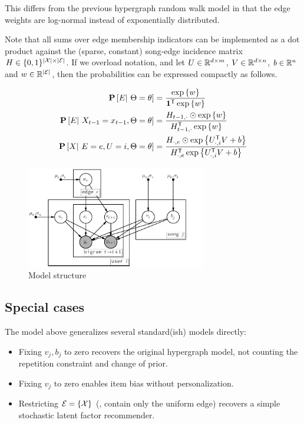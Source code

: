 \documentclass{article}
\def\E{\ensuremath{\mathcal{E}}}
\begin{document}
This differs from the previous hypergraph random walk model in that the edge weights are log-normal instead of exponentially distributed.  

Note that all sums over edge membership indicators can be implemented as a dot product against the (sparse, constant) 
song-edge incidence matrix $H \in \{0,1\}^{|\X| \times |\E|}$.  If we overload notation, and let $U \in \mathbb{R}^{d\times m}$, $V \in \mathbb{R}^{d \times n}$, $b \in \mathbb{R}^{n}$ and $w \in
\R^{|\E|}$, then the probabilities can be expressed compactly as follows.

\begin{align*}
\mathbf{P}\left[E |~ \Theta=\theta\right] &= \frac{\exp\left\{w\right\}}{\mathbf{1}^\mathsf{T} \exp\left\{w\right\}}\\
\mathbf{P}\left[E |~ X_{t-1}=x_{t-1}, \Theta=\theta\right] &= \frac{ H_{t-1, \cdot} \odot \exp\left\{w\right\} }{H_{t-1, \cdot}^\mathsf{T} \exp\left\{w\right\}}\\
\mathbf{P}\left[X |~ E=e, U=i, \Theta=\theta\right] &= \frac{ H_{\cdot, e} \odot \exp\left\{U_{\cdot,i}^\mathsf{T} V + b\right\} }{ H_{\cdot, e}^\mathsf{T} \exp\left\{U_{\cdot,i}^\mathsf{T} V + b\right\}}
\end{align*}

\begin{figure}
\centering
\includegraphics[width=0.7\textwidth]{model}
\caption{Model structure}
\end{figure}

\subsection{Special cases}
The model above generalizes several standard(ish) models directly:
\begin{itemize}
\item Fixing $v_j, b_j$ to zero recovers the original hypergraph model, not counting the repetition constraint and
change of prior.
\item Fixing $v_j$ to zero enables item bias without personalization.
\item Restricting $\E = \{ \X \}$ (\ie, contain only the uniform edge) recovers a simple stochastic latent factor recommender.
\end{itemize}
\end{document}
